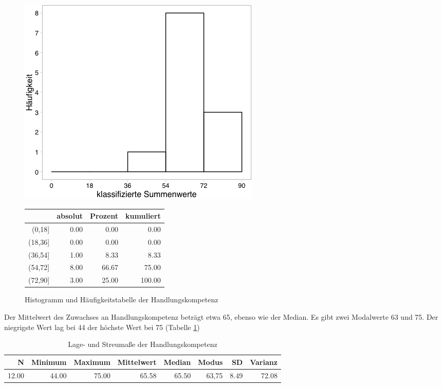 \documentclass[12pt, bibliography=totoc]{scrartcl}
\begin{document}
\begin{figure}[H]
\begin{minipage}{.4\linewidth}
\includegraphics[width=0.8\linewidth]{Anhang/HKHistnn.png}

\label{pic:aufbau}
\end{minipage}
\begin{minipage}{.4\linewidth}
\centering
\raisebox{\depth}
{\begin{tabular}{rrrr}
  \hline
 & absolut & Prozent & kumuliert \\ 
  \hline
(0,18] & 0.00 & 0.00 & 0.00 \\ 
  (18,36] & 0.00 & 0.00 & 0.00 \\ 
  (36,54] & 1.00 & 8.33 & 8.33 \\ 
  (54,72] & 8.00 & 66.67 & 75.00 \\ 
  (72,90] & 3.00 & 25.00 & 100.00 \\ 
   \hline
\end{tabular}

}
\label{tab:defis}
\end{minipage}
\caption{Histogramm und Häufigkeitstabelle der Handlungskompetenz}
\label{fig:HK}
\end{figure}

Der Mittelwert des Zuwachses an Handlungskompetenz beträgt etwa 65,
ebenso wie der Median. Es gibt zwei Modalwerte 63 und 75. Der niegrigste
Wert lag bei 44 der höchste Wert bei 75 (Tabelle \ref{lHK})

\begin{table}[H]
\centering
\caption{Lage- und Streumaße der Handlungskompetenz}
\label{lHK}
\begin{tabular}{rrrrrrrr}
  \hline
  N & Minimum & Maximum & Mittelwert & Median & Modus & SD & Varianz \\
  \hline
12.00 & 44.00 & 75.00 & 65.58 & 65.50 & 63,75 & 8.49 & 72.08 \\
   \hline
\end{tabular}
\end{table}
\end{document}
